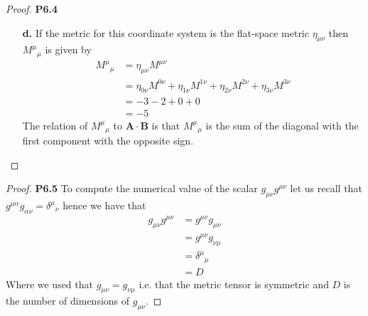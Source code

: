 \documentclass[11pt]{article}
\theoremstyle{definition}
\begin{document}
\begin{proof}{\textbf{P6.4}}
\begin{itemize}
    \item [\textbf{d.}] If the metric for this coordinate system is the
    flat-space metric $\eta_{\mu\nu}$ then ${M^\mu}_\mu$ is given by
    \begin{align*}
        {M^{\mu}}_\mu &= \eta_{\mu\nu} M^{\mu\nu}\\
        &= \eta_{0\nu} M^{0\nu} +
            \eta_{1\nu} M^{1\nu} +
            \eta_{2\nu} M^{2\nu} +
            \eta_{3\nu} M^{3\nu}\\
        &= -3  -2 + 0 + 0\\
        &=-5
    \end{align*}
    The relation of ${M^\mu}_\mu$ to $\bm{A\cdot B}$ is that ${M^\mu}_\mu$
    is the sum of the diagonal with the first component with
    the opposite sign.
\end{itemize}
\end{proof}
\cleardoublepage
\begin{proof}{\textbf{P6.5}}
    To compute the numerical value of the scalar $g_{\mu\nu}g^{\mu\nu}$
    let us recall that $g^{\mu\alpha}g_{\alpha\nu} = {\delta^{\mu}}_\nu$
    hence we have that
    \begin{align*}
        g_{\mu\nu}g^{\mu\nu} &= g^{\mu\nu}g_{\mu\nu}\\
            &= g^{\mu\nu}g_{\nu\mu}\\
            &= {\delta^{\mu}}_\mu\\
            &= D
    \end{align*}
    Where we used that $g_{\mu\nu} = g_{\nu\mu}$ i.e. that the metric tensor
    is symmetric and $D$ is the number of dimensions of $g_{\mu\nu}$. 
\end{proof}
\cleardoublepage
\end{document}

